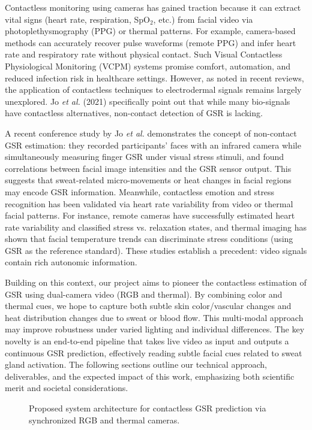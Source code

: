 \documentclass[12pt]{article}
\begin{document}
    Contactless monitoring using cameras has gained traction because it can extract vital signs (heart rate, respiration, SpO$_2$, etc.) from facial video via photoplethysmography (PPG) or thermal patterns. For example, camera-based methods can accurately recover pulse waveforms (remote PPG) and infer heart rate and respiratory rate without physical contact. Such Visual Contactless Physiological Monitoring (VCPM) systems promise comfort, automation, and reduced infection risk in healthcare settings. However, as noted in recent reviews, the application of contactless techniques to electrodermal signals remains largely unexplored. Jo \emph{et al.} (2021) specifically point out that while many bio-signals have contactless alternatives, non-contact detection of GSR is lacking.

    A recent conference study by Jo \emph{et al.} demonstrates the concept of non-contact GSR estimation: they recorded participants' faces with an infrared camera while simultaneously measuring finger GSR under visual stress stimuli, and found correlations between facial image intensities and the GSR sensor output. This suggests that sweat-related micro-movements or heat changes in facial regions may encode GSR information. Meanwhile, contactless emotion and stress recognition has been validated via heart rate variability from video or thermal facial patterns. For instance, remote cameras have successfully estimated heart rate variability and classified stress vs. relaxation states, and thermal imaging has shown that facial temperature trends can discriminate stress conditions (using GSR as the reference standard). These studies establish a precedent: video signals contain rich autonomic information.

    Building on this context, our project aims to pioneer the contactless estimation of GSR using dual-camera video (RGB and thermal). By combining color and thermal cues, we hope to capture both subtle skin color/vascular changes and heat distribution changes due to sweat or blood flow. This multi-modal approach may improve robustness under varied lighting and individual differences. The key novelty is an end-to-end pipeline that takes live video as input and outputs a continuous GSR prediction, effectively reading subtle facial cues related to sweat gland activation. The following sections outline our technical approach, deliverables, and the expected impact of this work, emphasizing both scientific merit and societal considerations.

    \begin{figure}[ht]
        \centering
        \caption{Proposed system architecture for contactless GSR prediction via synchronized RGB and thermal cameras.}
        \label{fig:architecture}
    \end{figure}
\end{document}
